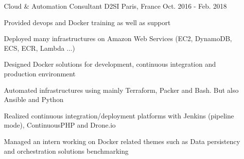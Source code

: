 \begin{cventries}
  \cventry
    {Cloud \& Automation Consultant} %
    {D2SI} %
    {Paris, France} %
    {Oct. 2016 - Feb. 2018} %
    {
      \begin{cvitems} %
        \item {Provided devops and Docker training as well as support}
        \item {Deployed many infrastructures on Amazon Web Services (EC2, DynamoDB, ECS, ECR, Lambda ...)}
        \item {Designed Docker solutions for development, continuous integration and production environment}
        \item {Automated infrastructures using mainly Terraform, Packer and Bash. But also Ansible and Python}
        \item {Realized continuous integration/deployment platforms with Jenkins (pipeline mode), ContinuousPHP and Drone.io}
        \item {Managed an intern working on Docker related themes such as Data persistency and orchestration solutions benchmarking}
      \end{cvitems}
    }



\end{cventries}
